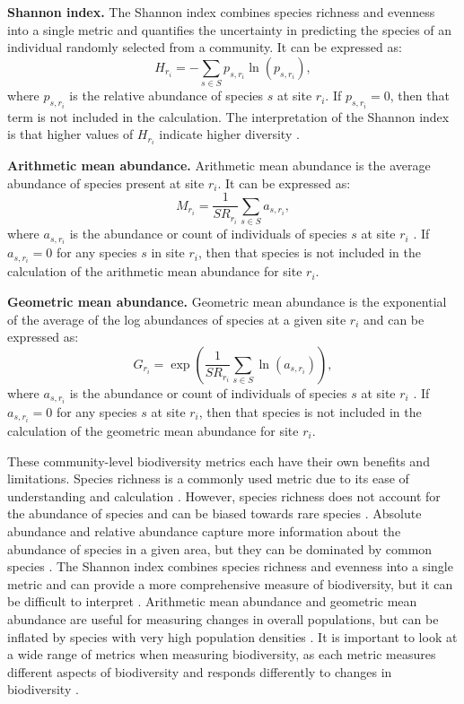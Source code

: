 \noindent\textbf{Shannon index.} The Shannon index combines species richness and evenness into a single metric and quantifies the uncertainty in predicting the species of an individual randomly selected from a community. It can be expressed as:
\begin{equation}
H_{r_i} = -\sum_{s \in S} p_{s,r_i} \ln(p_{s,r_i}),
\label{eq:shannon-index}
\end{equation}
where \(p_{s,r_i}\) is the relative abundance of species \(s\) at site \(r_i\). If \(p_{s,r_i} = 0\), then that term is not included in the calculation. The interpretation of the Shannon index is that higher values of \(H_{r_i}\) indicate higher diversity \parencite{dusek2017}. 

\noindent\textbf{Arithmetic mean abundance.} Arithmetic mean abundance is the average abundance of species present at site \(r_i\). It can be expressed as:
\begin{equation}
M_{r_i} = \frac{1}{SR_{r_i}} \sum_{s \in S} a_{s,r_i},
\label{eq:arithmetic-mean-abundance}
\end{equation}
where \(a_{s,r_i}\) is the abundance or count of individuals of species \(s\) at site \(r_i\) \parencite{santini2017}. If \(a_{s,r_i} = 0\) for any species \(s\) in site \(r_i\), then that species is not included in the calculation of the arithmetic mean abundance for site \(r_i\).

\noindent\textbf{Geometric mean abundance.} Geometric mean abundance is the exponential of the average of the log abundances of species at a given site \(r_i\) and can be expressed as:
\begin{equation}
G_{r_i} = \exp\left(\frac{1}{SR_{r_i}} \sum_{s \in S} \ln\left(a_{s,r_i}\right)\right),
\label{eq:geometric-mean-abundance}
\end{equation}
where \(a_{s,r_i}\) is the abundance or count of individuals of species \(s\) at site \(r_i\) \parencite{santini2017}. If \(a_{s,r_i} = 0\) for any species \(s\) at site \(r_i\), then that species is not included in the calculation of the geometric mean abundance for site \(r_i\).

These community-level biodiversity metrics each have their own benefits and limitations. Species richness is a commonly used metric due to its ease of understanding and calculation \parencite{lamb2009, ozkan_tumer_two_2026}. However, species richness does not account for the abundance of species and can be biased towards rare species \parencite{ferrier2006}. Absolute abundance and relative abundance capture more information about the abundance of species in a given area, but they can be dominated by common species \parencite{beery2021}. The Shannon index combines species richness and evenness into a single metric and can provide a more comprehensive measure of biodiversity, but it can be difficult to interpret \parencite{dusek2017}. Arithmetic mean abundance and geometric mean abundance are useful for measuring changes in overall populations, but can be inflated by species with very high population densities \parencite{santini2017}. It is important to look at a wide range of metrics when measuring biodiversity, as each metric measures different aspects of biodiversity and responds differently to changes in biodiversity \parencite{lamb2009, santini2017}.

